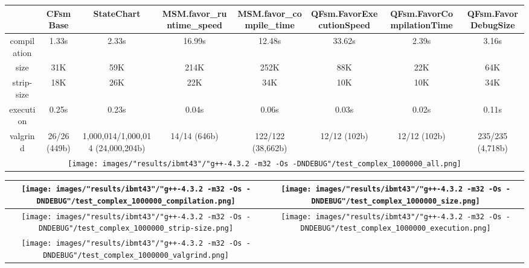 \begin{landscape}
\begin{table}
\caption{"ibmt43" [df6407d], g++-4.3.2 -m32 -Os -DNDEBUG/test complex 1000000}
\centering
\begin{longtable}{| c | c |c |c |c |c |c |c |}
\hline
& CFsmBase& StateChart& MSM.favor\_runtime\_speed& MSM.favor\_compile\_time& QFsm.FavorExecutionSpeed& QFsm.FavorCompilationTime& QFsm.FavorDebugSize\\
\hline
compilation & 1.33s & 2.33s & 16.99s & 12.48s & 33.62s & 2.39s & 3.16s\\
\hline
size & 31K & 59K & 214K & 252K & 88K & 22K & 64K\\
\hline
strip-size & 18K & 26K & 22K & 34K & 10K & 10K & 34K\\
\hline
execution & 0.25s & 0.23s & 0.04s & 0.06s & 0.03s & 0.02s & 0.11s\\
\hline
valgrind & 26/26 (449b) & 1,000,014/1,000,014 (24,000,204b) & 14/14 (646b) & 122/122 (38,662b) & 12/12 (102b) & 12/12 (102b) & 235/235 (4,718b)\\
\hline
\multicolumn{8}{|c|}{\texttt{[image: images/"results/ibmt43"/"g++-4.3.2 -m32 -Os -DNDEBUG"/test\_complex\_1000000\_all.png]}}\\
\hline
\end{longtable}
\end{table}
\end{landscape}
\newpage
\begin{table}
\centering
\begin{longtable}{| c | c |}
\hline
\texttt{[image: images/"results/ibmt43"/"g++-4.3.2 -m32 -Os -DNDEBUG"/test\_complex\_1000000\_compilation.png]}& \texttt{[image: images/"results/ibmt43"/"g++-4.3.2 -m32 -Os -DNDEBUG"/test\_complex\_1000000\_size.png]}\\
\hline
\texttt{[image: images/"results/ibmt43"/"g++-4.3.2 -m32 -Os -DNDEBUG"/test\_complex\_1000000\_strip-size.png]}& \texttt{[image: images/"results/ibmt43"/"g++-4.3.2 -m32 -Os -DNDEBUG"/test\_complex\_1000000\_execution.png]}\\
\hline
\texttt{[image: images/"results/ibmt43"/"g++-4.3.2 -m32 -Os -DNDEBUG"/test\_complex\_1000000\_valgrind.png]}& \\ \hline
\end{longtable}
\end{table}
